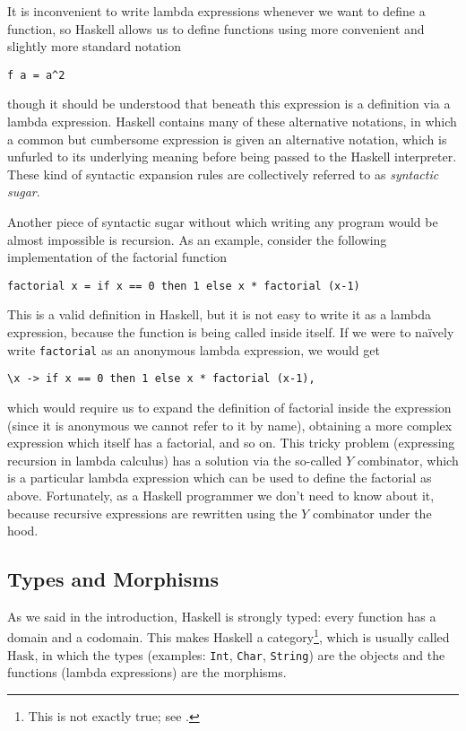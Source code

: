 \documentclass[11pt]{article}
\theoremstyle{nonumberplain}
\newcommand{\Hask}{\mathrm{Hask}}
\begin{document}
It is inconvenient to write lambda expressions whenever we want to define a function, so Haskell allows us to define functions using more convenient and slightly more standard notation
\begin{lstlisting}
f a = a^2
\end{lstlisting}
though it should be understood that beneath this expression is a definition via a lambda expression. Haskell contains many of these alternative notations, in which a common but cumbersome expression is given an alternative notation, which is unfurled to its underlying meaning before being passed to the Haskell interpreter. These kind of syntactic expansion rules are collectively referred to as \emph{syntactic sugar}.

Another piece of syntactic sugar without which writing any program would be almost impossible is recursion. As an example, consider the following implementation of the factorial function
\begin{lstlisting}
factorial x = if x == 0 then 1 else x * factorial (x-1)
\end{lstlisting}

This is a valid definition in Haskell, but it is not easy to write it as a lambda expression, because the function is being called inside itself. If we were to naïvely write \lstinline|factorial| as an anonymous lambda expression, we would get
\begin{lstlisting}
\x -> if x == 0 then 1 else x * factorial (x-1),
\end{lstlisting}
which would require us to expand the definition of factorial inside the expression (since it is anonymous we cannot refer to it by name), obtaining a more complex expression which itself has a factorial, and so on. This tricky problem (expressing recursion in lambda calculus) has a solution via the so-called $Y$ combinator, which is a particular lambda expression which can be used to define the factorial as above. Fortunately, as a Haskell programmer we don't need to know about it, because recursive expressions are rewritten using the $Y$ combinator under the hood.

\subsection{Types and Morphisms}

As we said in the introduction, Haskell is strongly typed: every function has a domain and a codomain. This makes Haskell a category\footnote{This is not exactly true; see \cite{haskisnotcat}.}, which is usually called $\Hask$, in which the types (examples: \lstinline|Int|, \lstinline|Char|, \lstinline|String|) are the objects and the functions (lambda expressions) are the morphisms.
\end{document}
